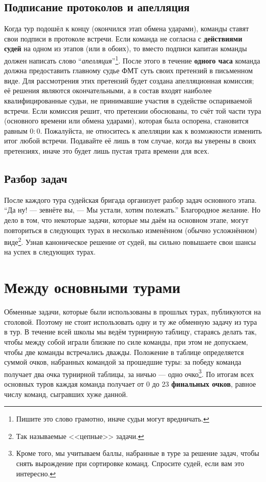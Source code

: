 \documentclass[12pt]{article}
\begin{document}
\subsection*{Подписание протоколов и апелляция}
Когда тур подошёл к концу (окончился этап обмена ударами), команды ставят свои подписи в протоколе встречи. Если команда не согласна с {\bf действиями судей} на одном из этапов (или в обоих), то вместо подписи капитан команды должен написать слово ``\textsl{апелляция}''\footnote{Пишите это слово грамотно, иначе судьи могут вредничать.}. После этого в течение {\bf одного часа} команда должна предоставить главному судье ФМТ суть своих претензий в письменном виде. Для рассмотрения этих претензий будет создана апелляционная комиссия; её решения являются окончательными, а в состав входят наиболее квалифицированные судьи, не принимавшие участия в судействе оспариваемой встречи. Если комиссия решит, что претензии обоснованы, то счёт той части тура (основного времени или обмена ударами), которая была оспорена, становится равным $0:0$. Пожалуйста, не относитесь к апелляции как к возможности изменить итог любой встречи. Подавайте её лишь в том случае, когда вы уверены в своих претензиях, иначе это будет лишь пустая трата времени для всех.

\subsection*{Разбор задач}
После каждого тура судейская бригада организует разбор задач основного этапа. ``Да ну! --- зевнёте вы, --- Мы устали, хотим полежать.'' Благородное желание. Но дело в том, что некоторые задачи, которые мы даём на основном этапе, могут повториться в следующих турах в несколько изменённом (обычно усложнённом) виде\footnote{Так называемые <<цепные>> задачи.}. Узнав каноническое решение от судей, вы сильно повышаете свои шансы на успех в следующих турах.

\section*{Между основными турами}
Обменные задачи, которые были использованы в прошлых турах, публикуются на столовой. Поэтому не стоит использовать одну и ту же обменную задачу из тура в тур. В течение всей школы мы ведём турнирную таблицу, стараясь делать так, чтобы между собой играли близкие по силе команды, при этом не допускаем, чтобы две команды встречались дважды. Положение в таблице определяется суммой очков, набранных командой за прошедшие туры: за победу команда получает два очка турнирной таблицы, за ничью --- одно очко\footnote{Кроме того, мы учитываем баллы, набранные в туре за решение задач, чтобы снять вырождение при сортировке команд. Спросите судей, если вам это интересно.}. По итогам всех основных туров каждая команда получает от 0 до 23 {\bf финальных очков}, равное числу команд, сыгравших хуже данной.
\end{document}
